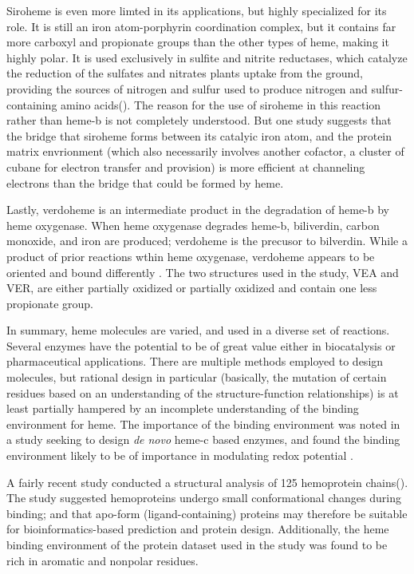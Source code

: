 \documentclass[a4paper, nobind]{templates/ociamthesis}
\begin{document}
Siroheme is even more limted in its applications, but highly specialized for its role. It is still an iron atom-porphyrin coordination complex, but it contains far more carboxyl and propionate groups than the other types of heme, making it highly polar. It is used exclusively in sulfite and nitrite reductases, which catalyze the reduction of the sulfates and nitrates plants uptake from the ground, providing the sources of nitrogen and sulfur used to produce nitrogen and sulfur-containing amino acids(\textcite{Tripathy2010}). The reason for the use of siroheme in this reaction rather than heme-b is not completely understood. But one study suggests that the bridge that siroheme forms between its catalyic iron atom, and the protein matrix envrionment (which also necessarily involves another cofactor, a cluster of cubane for electron transfer and provision) is more efficient at channeling electrons than the bridge that could be formed by heme.\autocite{Branzanic2019}

Lastly, verdoheme is an intermediate product in the degradation of heme-b by heme oxygenase. When heme oxygenase degrades heme-b, biliverdin, carbon monoxide, and iron are produced; verdoheme is the precusor to bilverdin\autocite{Lai2010,Sato2007}. While a product of prior reactions wthin heme oxygenase, verdoheme appears to be oriented and bound differently \autocite{Lad2004}. The two structures used in the study, VEA and VER, are either partially oxidized or partially oxidized and contain one less propionate group.

In summary, heme molecules are varied, and used in a diverse set of reactions. Several enzymes have the potential to be of great value either in biocatalysis or pharmaceutical applications. There are multiple methods employed to design molecules, but rational design in particular (basically, the mutation of certain residues based on an understanding of the structure-function relationships) is at least partially hampered by an incomplete understanding of the binding environment for heme. The importance of the binding environment was noted in a study seeking to design \emph{de novo} heme-c based enzymes, and found the binding environment likely to be of importance in modulating redox potential \autocite{Ishida2004}.

A fairly recent study conducted a structural analysis of 125 hemoprotein chains(\textcite{Li2011}). The study suggested hemoproteins undergo small conformational changes during binding; and that apo-form (ligand-containing) proteins may therefore be suitable for bioinformatics-based prediction and protein design. Additionally, the heme binding environment of the protein dataset used in the study was found to be rich in aromatic and nonpolar residues.
\end{document}
